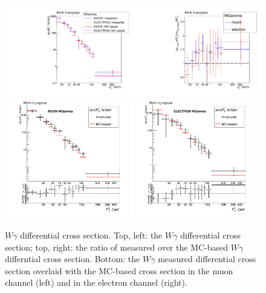 \begin{figure}[htb]
  \begin{center}
   \includegraphics[width=0.5\textwidth]{../figs/figs_v11/ChannelsMERGED_WGamma/CrossSection/compareCSWGamma.pdf}\includegraphics[width=0.5\textwidth]{../figs/figs_v11/ChannelsMERGED_WGamma/CrossSection/compareCSratioTheoryWGamma.pdf}
      \includegraphics[width=0.48\textwidth]{../figs/figs_v11/MUON_WGamma/CrossSection/c_CS_MUON_WGamma_UNblind.png} \includegraphics[width=0.48\textwidth]{../figs/figs_v11/ELECTRON_WGamma/CrossSection/c_CS_ELECTRON_WGamma_UNblind.png}
  \caption{$W\gamma$ differential cross section. Top, left: the $W\gamma$ differential cross section; top, right: the ratio of measured over the MC-based $W\gamma$ differntial cross section. Bottom:  the $W\gamma$ measured differential cross section overlaid with the MC-based cross section in the muon channel (left) and in the electron channel (right).}
  \label{fig:CS_Wg}
 \end{center}
\end{figure}



